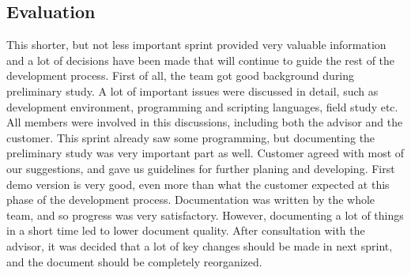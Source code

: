 \subsection{Evaluation}
	This shorter, but not less important sprint provided very valuable information and a lot of decisions have been made that will continue to guide the rest of the development process. First of all, the team got good background during preliminary study. A lot of important issues were discussed in detail, such as development environment, programming and scripting languages, field study etc. All members were involved in this discussions, including both the advisor and the customer. This sprint already saw some programming, but documenting the preliminary study was very important part as well.\newline
	Customer agreed with most of our suggestions, and gave us guidelines for further planing and developing. First demo version is very good, even more than what the customer expected at this phase of the development process.\newline
	Documentation was written by the whole team, and so progress was very satisfactory. However, documenting a lot of things in a short time led to lower document quality. After consultation with the advisor, it was decided that a lot of key changes should be made in next sprint, and the document should be completely reorganized.
